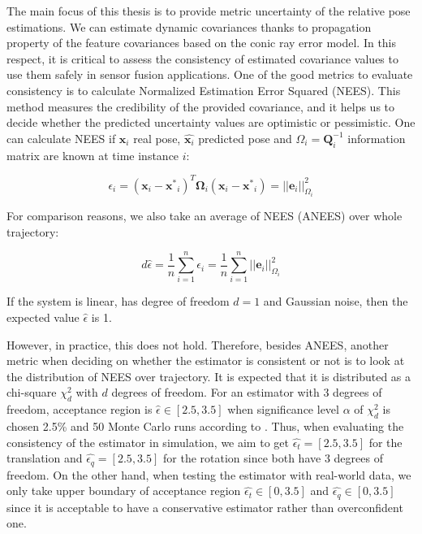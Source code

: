 \documentclass[a4paper]{report}
\numberwithin{figure}{section}
\begin{document}
The main focus of this thesis is to provide metric uncertainty of the relative pose estimations. We can estimate dynamic covariances thanks to propagation property of the feature covariances based on the conic ray error model. In this respect, it is critical to assess the consistency of estimated covariance values to use them safely in sensor fusion applications.  One of the good metrics to evaluate consistency is to calculate Normalized Estimation Error Squared (NEES). This method measures the credibility of the provided covariance, and it helps us to decide whether the predicted uncertainty values are optimistic or pessimistic.  One can calculate NEES if $\mathbf{x}_i$ real pose, $\hat{\mathbf{x}_i}$ predicted pose and $\Omega_i = \mathbf{Q}_i^{-1}$ information matrix are known at time instance $i$:

\begin{equation}
  \epsilon_i = (\mathbf{x}_i - \mathbf{x^*}_i)^T \mathbf{\Omega}_i (\mathbf{x}_i - \mathbf{x^*}_i) 
  = ||\mathbf{e}_i||^2_{\Omega_i}
\end{equation}


For comparison reasons, we also take an average of NEES (ANEES) over whole trajectory:

\begin{equation}
  d \hat{\epsilon} =  \frac{1}{n} \sum_{i=1}^{n} \epsilon_i = 
  \frac{1}{n} \sum_{i=1}^{n} ||\mathbf{e}_i||^2_{\Omega_i}
\end{equation}

If the system is linear, has degree of freedom $d=1$ and Gaussian noise, 
then the expected value 
$\hat{\epsilon}$ is 1. 

However, in practice, this does not hold. Therefore, besides ANEES, another 
metric when deciding on whether the estimator is consistent or not is to look 
at the distribution of NEES over trajectory.  It is expected that it is 
distributed as a chi-square $\chi_d^2$ with $d$ degrees of freedom.  For an 
estimator with 3 degrees of freedom, acceptance region is $\hat{\epsilon} \in 
[2.5,3.5]$ when significance level $\alpha$ of $\chi_d^2$ is chosen 2.5\% and 
50 Monte Carlo runs according to \parencite[see][234--235]{Shalom2001}.  Thus, 
when evaluating the consistency of the estimator in simulation, we aim to get 
$\hat{\epsilon_t}=[2.5,3.5]$ for the translation and 
$\hat{\epsilon_q}=[2.5,3.5]$ for the rotation since both have 3 degrees of 
freedom. On the other hand, when testing the estimator with real-world data, 
we only take upper boundary of acceptance region $\hat{\epsilon_t} \in [0, 
3.5]$ and $\hat{\epsilon_q} \in [0, 3.5]$ since it is acceptable to have a 
conservative estimator rather than overconfident one.
\end{document}
